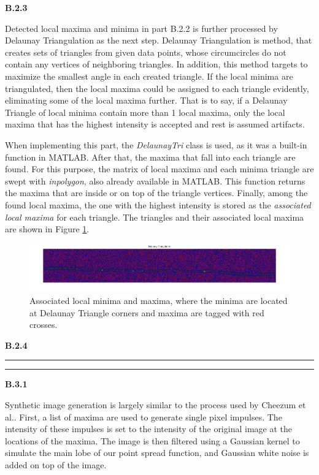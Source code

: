 \documentclass{article}
\newcommand{\question}[1] {\vspace{.25in} \hrule\vspace{0.5em}
\noindent{\bf #1} \vspace{0.5em}
\hrule \vspace{.10in}}
\begin{document}
\textbf{B.2.3}

Detected local maxima and minima in part B.2.2 is further processed by Delaunay Triangulation\cite{delaunaywiki}\cite{delaunaymathworks} as the next step. Delaunay Triangulation is method, that creates sets of triangles from given data points, whose circumcircles do not contain any vertices of neighboring triangles. In addition, this method targets to maximize the smallest angle in each created triangle. If the local minima are triangulated, then the local maxima could be assigned to each triangle evidently, eliminating some of the local maxima further. That is to say, if a Delaunay Triangle of local minima contain more than 1 local maxima, only the local maxima that has the highest intensity is accepted and rest is assumed artifacts.

When implementing this part, the \emph{DelaunayTri} class is used, as it was a built-in function in MATLAB. After that, the maxima that fall into each triangle are found. For this purpose, the matrix of local maxima and each minima triangle are swept with \emph{inpolygon}, also already available in MATLAB. This function returns the maxima that are inside or on top of the triangle vertices. Finally, among the found local maxima, the one with the highest intensity is stored as the \emph{associated local maxima} for each triangle. The triangles and their associated local maxima are shown in Figure \ref{fig:assocLocal}.

\begin{figure}[h]
\centering
\includegraphics[width=16cm]{figures/assocLocalExtrema.png}
\caption{Associated local minima and maxima, where the minima are located at Delaunay Triangle corners and maxima are tagged with red crosses.}
\label{fig:assocLocal}
\end{figure}



\textbf{B.2.4}




\pagebreak
\question{Part 2: Sub-pixel Resolution Particle Detection}

\textbf{B.3.1}

Synthetic image generation is largely similar to the process used by Cheezum et al.\cite{cheezum}. First, a list of maxima are used to generate single pixel impulses. The intensity of these impulses is set to the intensity of the original image at the locations of the maxima. The image is then filtered using a Gaussian kernel to simulate the main lobe of our point spread function, and Gaussian white noise is added on top of the image.
\end{document}
